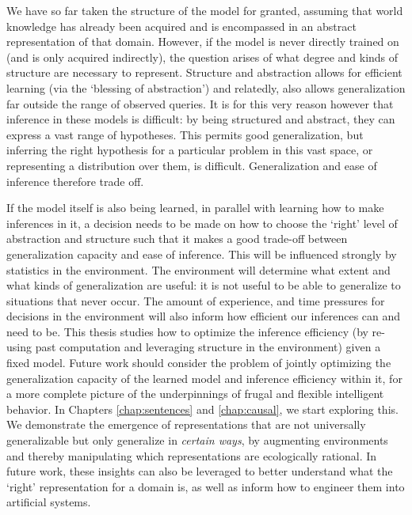 We have so far taken the structure of the model for granted, assuming that world knowledge has already been acquired and is encompassed in an abstract representation of that domain. However, if the model is never directly trained on (and is only acquired indirectly), the question arises of what degree and kinds of structure are necessary to represent. Structure and abstraction allows for efficient learning (via the `blessing of abstraction'\cite{harlow1949formation, kemp2007learning, goodman1983fact}) and relatedly, also allows generalization far outside the range of observed queries. It is for this very reason however that inference in these models is difficult: by being structured and abstract, they can express a vast range of hypotheses. This permits good generalization, but inferring the right hypothesis for a particular problem in this vast space, or representing a distribution over them, is difficult. Generalization and ease of inference therefore trade off. 

If the model itself is also being learned, in parallel with learning how to make inferences in it, a decision needs to be made on how to choose the `right' level of abstraction and structure such that it makes a good trade-off between generalization capacity and ease of inference. This will be influenced strongly by statistics in the environment. The environment will determine what extent and what kinds of generalization are useful: it is not useful to be able to generalize to situations that never occur. The amount of experience, and time pressures for decisions in the environment will also inform how efficient our inferences can and need to be. This thesis studies how to optimize the inference efficiency (by re-using past computation and leveraging structure in the environment) given a fixed model. Future work should consider the problem of jointly optimizing the generalization capacity of the learned model and inference efficiency within it, for a more complete picture of the underpinnings of frugal and flexible intelligent behavior. In Chapters \ref{chap:sentences} and \ref{chap:causal}, we start exploring this. We demonstrate the emergence of representations that are not universally generalizable but only generalize in \textit{certain ways}, by augmenting environments and thereby manipulating which representations are ecologically rational. In future work, these insights can also be leveraged to better understand what the `right' representation for a domain is, as well as inform how to engineer them into artificial systems.

